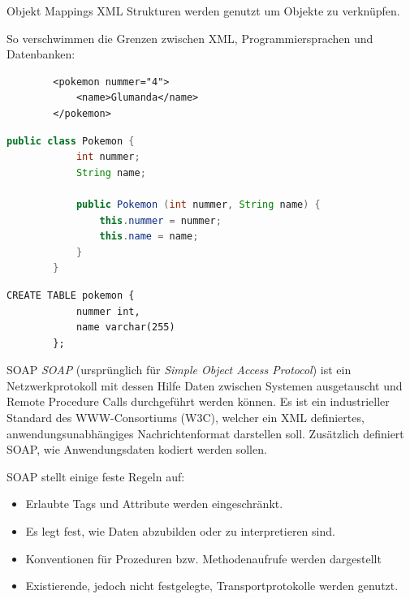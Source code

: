 \begin{bonus}{Objekt Mappings}
    XML Strukturen werden genutzt um Objekte zu verknüpfen.

    So verschwimmen die Grenzen zwischen XML, Programmiersprachen und Datenbanken:

    \begin{lstlisting}
        <pokemon nummer="4">
            <name>Glumanda</name>
        </pokemon>
    \end{lstlisting}

    \begin{lstlisting}[language=java]
        public class Pokemon {
            int nummer;
            String name;

            public Pokemon (int nummer, String name) {
                this.nummer = nummer;
                this.name = name;
            }
        }
    \end{lstlisting}

    \begin{lstlisting}[language=mysql]
        CREATE TABLE pokemon {
            nummer int,
            name varchar(255)
        };
    \end{lstlisting}
\end{bonus}

\begin{bonus}{SOAP}
    \emph{SOAP} (ursprünglich für \emph{Simple Object Access Protocol}) ist ein Netzwerkprotokoll mit dessen Hilfe Daten zwischen Systemen ausgetauscht und Remote Procedure Calls durchgeführt werden können.
    Es ist ein industrieller Standard des WWW-Consortiums (W3C), welcher ein XML definiertes, anwendungsunabhängiges Nachrichtenformat darstellen soll.
    Zusätzlich definiert SOAP, wie Anwendungsdaten kodiert werden sollen.

    SOAP stellt einige feste Regeln auf:
    \begin{itemize}
        \item Erlaubte Tags und Attribute werden eingeschränkt.
        \item Es legt fest, wie Daten abzubilden oder zu interpretieren sind.
        \item Konventionen für Prozeduren bzw. Methodenaufrufe werden dargestellt
        \item Existierende, jedoch nicht festgelegte, Transportprotokolle werden genutzt.
    \end{itemize}
\end{bonus}

